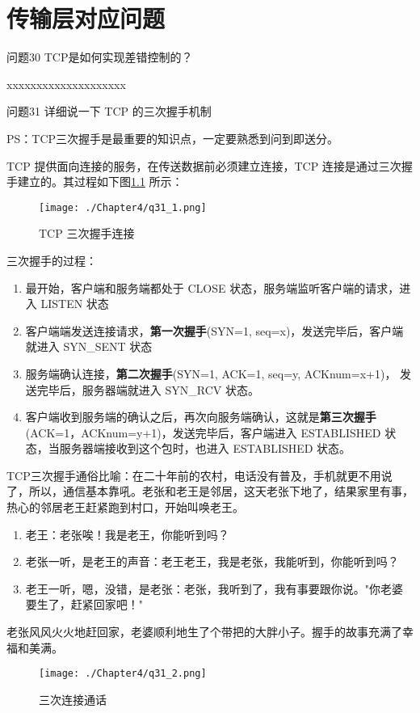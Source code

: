 \documentclass[cn,11pt,color=blue,lang=cn]{elegantbook}
\begin{document}
\chapter{传输层对应问题}

\begin{custom}{问题30}
TCP是如何实现差错控制的？
\end{custom}
\begin{solution}
xxxxxxxxxxxxxxxxxxxx
\end{solution}

\begin{custom}{问题31}
详细说一下 TCP 的三次握手机制
\end{custom}
\begin{solution}
PS：TCP三次握手是最重要的知识点，一定要熟悉到问到即送分。

TCP 提供面向连接的服务，在传送数据前必须建立连接，TCP 连接是通过三次握手建立的。其过程如下图\ref{fig31_1} 所示：
\begin{figure}[htbp]
\centering
\texttt{[image: ./Chapter4/q31\_1.png]}
\caption{TCP 三次握手连接}
\label{fig31_1}
\end{figure}

三次握手的过程：
\begin{enumerate}
	\item 最开始，客户端和服务端都处于 CLOSE 状态，服务端监听客户端的请求，进入 LISTEN 状态
	\item 客户端端发送连接请求，\textbf{第一次握手}(SYN=1, seq=x)，发送完毕后，客户端就进入 SYN\_SENT 状态
	\item 服务端确认连接，\textbf{第二次握手}(SYN=1, ACK=1, seq=y, ACKnum=x+1)， 发送完毕后，服务器端就进入 SYN\_RCV 状态。
	\item 客户端收到服务端的确认之后，再次向服务端确认，这就是\textbf{第三次握手} (ACK=1，ACKnum=y+1)，发送完毕后，客户端进入 ESTABLISHED 状态，当服务器端接收到这个包时，也进入 ESTABLISHED 状态。
\end{enumerate}

TCP三次握手通俗比喻：在二十年前的农村，电话没有普及，手机就更不用说了，所以，通信基本靠吼。老张和老王是邻居，这天老张下地了，结果家里有事，热心的邻居老王赶紧跑到村口，开始叫唤老王。

\begin{enumerate}
	\item 老王：老张唉！我是老王，你能听到吗？
	\item 老张一听，是老王的声音：老王老王，我是老张，我能听到，你能听到吗？
	\item 老王一听，嗯，没错，是老张：老张，我听到了，我有事要跟你说。"你老婆要生了，赶紧回家吧！"
\end{enumerate}  

老张风风火火地赶回家，老婆顺利地生了个带把的大胖小子。握手的故事充满了幸福和美满。
\begin{figure}[htbp]
\centering
\texttt{[image: ./Chapter4/q31\_2.png]}
\caption{三次连接通话}
\label{fig31_2}
\end{figure}
\end{solution}
\end{document}
